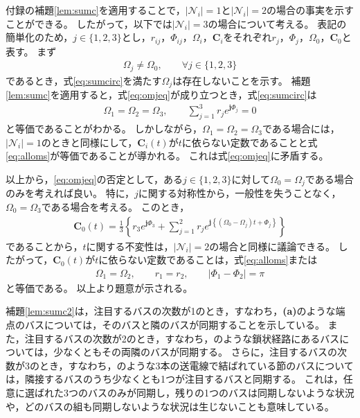 \documentclass[tombow,dvipdfmx]{corona-a5-1.1}
\begin{document}
\begin{証明}
付録の補題\ref{lem:sumc}を適用することで，$|\mathcal{N}_i|=1$と$|\mathcal{N}_i|=2$の場合の事実を示すことができる。
したがって，以下では$|\mathcal{N}_i|=3$の場合について考える。
表記の簡単化のため，$j \in\{1,2,3\}$とし，$r_{ij}$，$\Phi_{ij}$，$\Omega_i$，$\bm{C}_i$をそれぞれ$r_{j}$，$\Phi_{j}$，$\Omega_0$，$\bm{C}_0$と表す。
まず
\begin{align}\label{eq:omjeq}
\Omega_j \neq \Omega_0
,\qquad \forall j \in \{1,2,3\}
\end{align}
であるとき，式\ref{eq:sumcirc}を満たす$\Omega_j$は存在しないことを示す。
補題\ref{lem:sumc}を適用すると，式\ref{eq:omjeq}が成り立つとき，式\ref{eq:sumcirc}は
\begin{align*}
\Omega_1 = \Omega_2 = \Omega_3,\qquad
\sum_{j=1}^3 
r_j e^{\bm{j} \Phi_j}=0
\end{align*}
と等価であることがわかる。
しかしながら，$\Omega_1 = \Omega_2 = \Omega_3$である場合には，$|\mathcal{N}_i|=1$のときと同様にして，$\bm{C}_i (t)$が$t$に依らない定数であることと式\ref{eq:alloms}が等価であることが導かれる。
これは式\ref{eq:omjeq}に矛盾する。

以上から，\ref{eq:omjeq}の否定として，ある$j\in\{1,2,3\}$に対して$\Omega_0=\Omega_j$である場合のみを考えれば良い。
特に，$j$に関する対称性から，一般性を失うことなく，$\Omega_0=\Omega_3$である場合を考える。
このとき，
\begin{align*}
\bm{C}_0 (t) = \frac{1}{3} \left\{
r_3 e^{\bm{j} \Phi_3}
+
\sum_{j=1}^2
r_{j}
e^{\bm{j} 
\left\{
(\Omega_0 - \Omega_j)t + 
\Phi_{j}
\right\} }
\right\}
\end{align*}
であることから，$t$に関する不変性は，$|\mathcal{N}_i|=2$の場合と同様に議論できる。
したがって，$\bm{C}_0 (t)$が$t$に依らない定数であることは，式\ref{eq:alloms}または
\begin{align*}
\Omega_{1} = \Omega_{2}
,\qquad
r_{1} = r_{2}
,\qquad
|\Phi_{1}-\Phi_{2}| = \pi
\end{align*}
と等価である。
以上より題意が示される。
\end{証明}

補題\ref{lem:sumc2}は，注目するバスの次数が1のとき，すなわち，\textbf{(a)}のような端点のバスについては，そのバスと隣のバスが同期することを示している。
また，注目するバスの次数が2のとき，すなわち，のような鎖状経路にあるバスについては，少なくともその両隣のバスが同期する。
さらに，注目するバスの次数が3のとき，すなわち，のような3本の送電線で結ばれている節のバスについては，隣接するバスのうち少なくとも1つが注目するバスと同期する。
これは，任意に選ばれた3つのバスのみが同期し，残りの1つのバスは同期しないような状況や，どのバスの組も同期しないような状況は生じないことも意味している。
\end{document}
